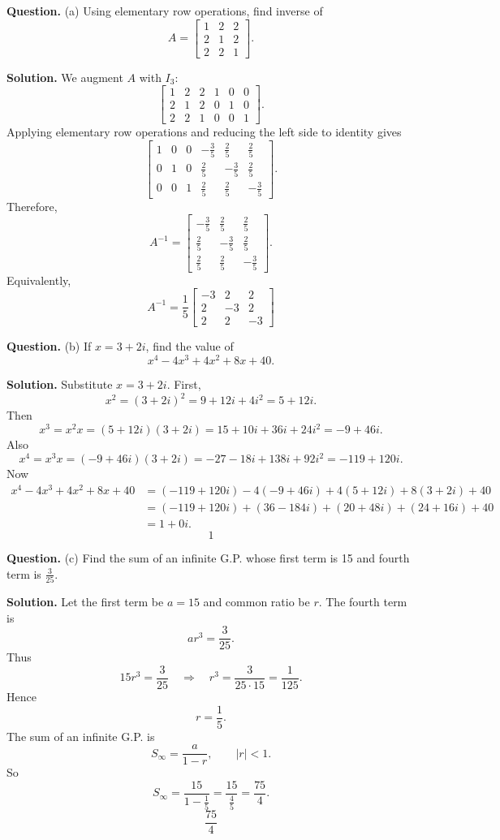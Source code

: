 \documentclass[11pt,a4paper]{article}
\newcommand{\question}[1]{\begin{questionbox}\textbf{Question.} #1\end{questionbox}}
\newcommand{\answer}{\begin{answerbox}\textbf{Solution.} }
\newcommand{\eanswer}{\end{answerbox}}
\newcommand{\finalans}[1]{\[\boxed{#1}\]}
\begin{document}
\question{(a) Using elementary row operations, find inverse of
\[
A=\begin{bmatrix}1&2&2\\2&1&2\\2&2&1\end{bmatrix}.
\]}
\answer
We augment \(A\) with \(I_3\):
\[
\left[\begin{array}{ccc|ccc}
1&2&2&1&0&0\\
2&1&2&0&1&0\\
2&2&1&0&0&1
\end{array}\right].
\]
Applying elementary row operations and reducing the left side to identity gives
\[
\left[\begin{array}{ccc|ccc}
1&0&0&-\frac35&\frac25&\frac25\\
0&1&0&\frac25&-\frac35&\frac25\\
0&0&1&\frac25&\frac25&-\frac35
\end{array}\right].
\]
Therefore,
\[
A^{-1}=\begin{bmatrix}
-\frac35&\frac25&\frac25\\
\frac25&-\frac35&\frac25\\
\frac25&\frac25&-\frac35
\end{bmatrix}.
\]
Equivalently,
\finalans{A^{-1}=\frac15\begin{bmatrix}-3&2&2\\2&-3&2\\2&2&-3\end{bmatrix}}
\eanswer

\question{(b) If \(x=3+2i\), find the value of
\[
x^4-4x^3+4x^2+8x+40.
\]}
\answer
Substitute \(x=3+2i\). First,
\[
x^2=(3+2i)^2=9+12i+4i^2=5+12i.
\]
Then
\[
x^3=x^2x=(5+12i)(3+2i)=15+10i+36i+24i^2=-9+46i.
\]
Also
\[
x^4=x^3x=(-9+46i)(3+2i)=-27-18i+138i+92i^2=-119+120i.
\]
Now
\begin{align*}
x^4-4x^3+4x^2+8x+40
&=(-119+120i)-4(-9+46i)+4(5+12i)+8(3+2i)+40\\
&=(-119+120i)+(36-184i)+(20+48i)+(24+16i)+40\\
&=1+0i.
\end{align*}
\finalans{1}
\eanswer

\question{(c) Find the sum of an infinite G.P. whose first term is 15 and fourth term is \(\frac{3}{25}\).}
\answer
Let the first term be \(a=15\) and common ratio be \(r\). The fourth term is
\[
ar^3=\frac{3}{25}.
\]
Thus
\[
15r^3=\frac{3}{25}
\quad\Rightarrow\quad
r^3=\frac{3}{25\cdot15}=\frac{1}{125}.
\]
Hence
\[
r=\frac15.
\]
The sum of an infinite G.P. is
\[
S_\infty=\frac{a}{1-r},\qquad |r|<1.
\]
So
\[
S_\infty=\frac{15}{1-\frac15}=\frac{15}{\frac45}=\frac{75}{4}.
\]
\finalans{\frac{75}{4}}
\eanswer
\end{document}
